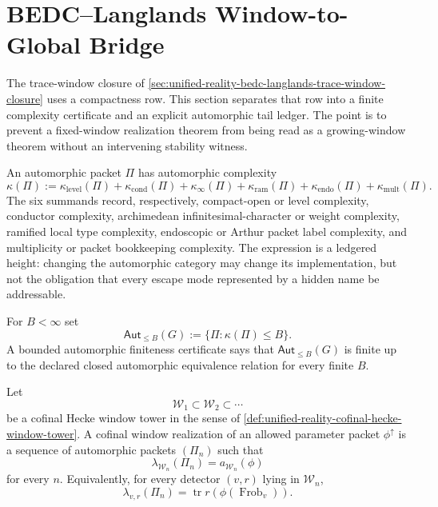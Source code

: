 \section{BEDC--Langlands Window-to-Global Bridge}
\label{sec:unified-reality-bedc-langlands-window-global-bridge}

The trace-window closure of
\autoref{sec:unified-reality-bedc-langlands-trace-window-closure}
uses a compactness row. This section separates that row into a finite
complexity certificate and an explicit automorphic tail ledger. The
point is to prevent a fixed-window realization theorem from being read
as a growing-window theorem without an intervening stability witness.

\begin{definition}
\label{def:unified-reality-automorphic-complexity}
An automorphic packet $\Pi$ has automorphic complexity
$$
\kappa(\Pi)
:=
\kappa_{\mathrm{level}}(\Pi)
+\kappa_{\mathrm{cond}}(\Pi)
+\kappa_{\infty}(\Pi)
+\kappa_{\mathrm{ram}}(\Pi)
+\kappa_{\mathrm{endo}}(\Pi)
+\kappa_{\mathrm{mult}}(\Pi).
$$
The six summands record, respectively, compact-open or level
complexity, conductor complexity, archimedean infinitesimal-character or
weight complexity, ramified local type complexity, endoscopic or Arthur
packet label complexity, and multiplicity or packet bookkeeping
complexity. The expression is a ledgered height: changing the
automorphic category may change its implementation, but not the
obligation that every escape mode represented by a hidden name be
addressable.
\end{definition}

\begin{definition}
\label{def:unified-reality-bounded-automorphic-finiteness-certificate}
For $B<\infty$ set
$$
\mathsf{Aut}_{\le B}(G)
:=
\{\Pi:\kappa(\Pi)\le B\}.
$$
A bounded automorphic finiteness certificate says that
$\mathsf{Aut}_{\le B}(G)$ is finite up to the declared closed
automorphic equivalence relation for every finite $B$.
\end{definition}

\begin{definition}
\label{def:unified-reality-cofinal-window-realization}
Let
$$
\mathcal W_1\subset \mathcal W_2\subset \cdots
$$
be a cofinal Hecke window tower in the sense of
\autoref{def:unified-reality-cofinal-hecke-window-tower}. A cofinal
window realization of an allowed parameter packet $\phi^{\uparrow}$ is a
sequence of automorphic packets $(\Pi_n)$ such that
$$
\lambda_{\mathcal W_n}(\Pi_n)=a_{\mathcal W_n}(\phi)
$$
for every $n$. Equivalently, for every detector $(v,r)$ lying in
$\mathcal W_n$,
$$
\lambda_{v,r}(\Pi_n)
=
\operatorname{tr}r(\phi(\operatorname{Frob}_v)).
$$
\end{definition}

